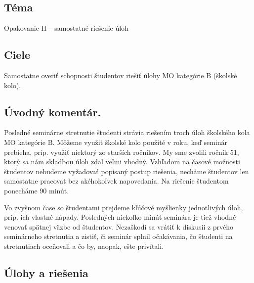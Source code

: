 
\subsection*{Téma}
Opakovanie II -- samostatné riešenie úloh

\subsection*{Ciele}
Samostatne overiť schopnosti študentov riešiť úlohy MO kategórie B (školské kolo).

\subsection*{Úvodný komentár.} Posledné seminárne stretnutie študenti strávia riešením troch úloh školského kola MO kategórie B. Môžeme využiť školské kolo použité v roku, keď seminár prebieha, príp. využiť niektorý zo starších ročníkov. My sme zvolili ročník 51, ktorý sa nám skladbou úloh zdal veľmi vhodný. Vzhľadom na časové možnosti študentov nebudeme vyžadovať popísaný postup riešenia, necháme študentov len samostatne pracovať bez akéhokoľvek napovedania. Na riešenie študentom ponecháme 90 minút. 

Vo zvyšnom čase so študentami prejdeme kľúčové myšlienky jednotlivých úloh, príp. ich vlastné nápady. Posledných niekoľko minút seminára je tiež vhodné venovať spätnej väzbe od študentov. Nezaškodí sa vrátiť k diskusii z prvého seminárneho stretnutia a zistiť, či seminár splnil očakávania, čo študenti na stretnutiach oceňovali a čo by, naopak, ešte privítali.


\subsection*{Úlohy a riešenia}

